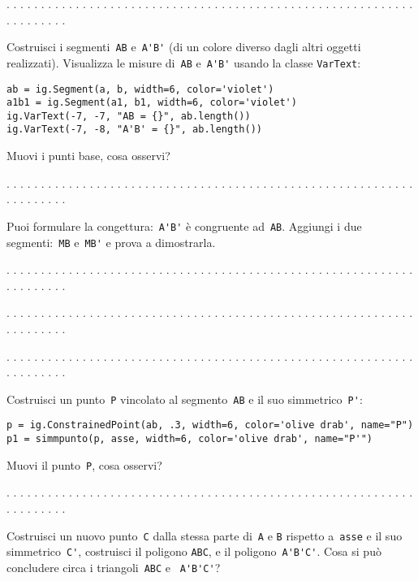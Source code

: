 . . . . . . . . . . . . . . . . . . . . . . . . . . . . . . . . . . . . . . . .
. . . . . . . . . . . . . . . . . . . . . . . . . . . .

Costruisci i segmenti~\lstinline{AB} e~\lstinline{A'B'}
(di un colore diverso dagli altri oggetti realizzati).
Visualizza le misure di~\lstinline{AB} e~\lstinline{A'B'} usando la classe 
\lstinline{VarText}:

\begin{lstlisting}
ab = ig.Segment(a, b, width=6, color='violet')
a1b1 = ig.Segment(a1, b1, width=6, color='violet')
ig.VarText(-7, -7, "AB = {}", ab.length())
ig.VarText(-7, -8, "A'B' = {}", ab.length())
\end{lstlisting}

Muovi i punti base, cosa osservi?

. . . . . . . . . . . . . . . . . . . . . . . . . . . . . . . . . . . . . . . .
. . . . . . . . . . . . . . . . . . . . . . . . . . . .

Puoi formulare la congettura:~\lstinline{A'B'} è congruente ad~\lstinline{AB}.
Aggiungi i due segmenti:~\lstinline{MB} e~\lstinline{MB'} e prova a dimostrarla.

. . . . . . . . . . . . . . . . . . . . . . . . . . . . . . . . . . . . . . . .
. . . . . . . . . . . . . . . . . . . . . . . . . . . .

. . . . . . . . . . . . . . . . . . . . . . . . . . . . . . . . . . . . . . . .
. . . . . . . . . . . . . . . . . . . . . . . . . . . .

. . . . . . . . . . . . . . . . . . . . . . . . . . . . . . . . . . . . . . . .
. . . . . . . . . . . . . . . . . . . . . . . . . . . .

Costruisci un punto~\lstinline{P} vincolato al segmento~\lstinline{AB} e il suo
simmetrico~\lstinline{P'}:

\begin{lstlisting}
p = ig.ConstrainedPoint(ab, .3, width=6, color='olive drab', name="P")
p1 = simmpunto(p, asse, width=6, color='olive drab', name="P'")
\end{lstlisting}

Muovi il punto~\lstinline{P}, cosa osservi?

. . . . . . . . . . . . . . . . . . . . . . . . . . . . . . . . . . . . . . . .
. . . . . . . . . . . . . . . . . . . . . . . . . . . .

Costruisci un nuovo punto~\lstinline{C} dalla stessa parte di~\lstinline{A} e 
\lstinline{B} rispetto
a~\lstinline{asse} e il suo simmetrico~\lstinline{C'}, costruisci il poligono 
\lstinline{ABC}, e il poligono~\lstinline{A'B'C'}.
Cosa si può concludere circa i triangoli~\lstinline{ABC} e ~\lstinline{A'B'C'}?

